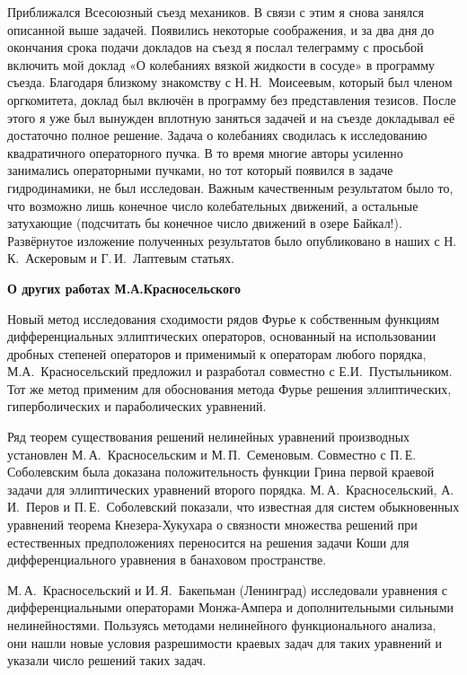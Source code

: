 Приближался Всесоюзный съезд механиков. В связи с этим я снова занялся описанной выше задачей. Появились некоторые соображения, и за два дня до окончания срока подачи докладов на съезд я послал телеграмму с просьбой включить мой доклад «О колебаниях вязкой жидкости в сосуде» в программу съезда. Благодаря близкому знакомству с Н.\,Н.~Моисеевым, который был членом оргкомитета, доклад был включён в программу без представления тезисов. После этого я уже был вынужден вплотную заняться задачей и на съезде докладывал её достаточно полное решение. Задача о колебаниях сводилась к исследованию квадратичного операторного пучка. В то время многие авторы усиленно занимались операторными пучками, но тот который появился в задаче гидродинамики, не был исследован. Важным качественным результатом было то, что возможно лишь конечное число колебательных движений, а остальные затухающие (подсчитать бы конечное число движений в озере Байкал!). Развёрнутое изложение полученных результатов было опубликовано в наших с Н.\,К.~Аскеровым и Г.\,И.~Лаптевым статьях.

{\bf О других работах М.А.Красносельского}

Новый метод исследования сходимости рядов Фурье к собственным фу\-н\-к\-ци\-ям дифференциальных эллиптических операторов,
основанный на  использовании дробных степеней операторов и применимый к операторам любого порядка,
М.А.~Красносельский предложил и разработал совместно с Е.И.~Пустыльником.  Тот же метод применим для обоснования метода Фурье
решения эллиптических, гиперболических и параболических уравнений.

Ряд теорем существования решений нелинейных уравнений производных установлен М.\,А.~Красносельским и
\linebreak
М.\,П.~Семеновым.
Совместно с П.\,Е. Соболевским  была доказана
положительность функции Грина первой краевой задачи для эллиптических уравнений второго порядка.
\linebreak
М.\,А.~Красносельский, А.\,И.~Перов и П.\,Е.~Соболевский показали,
что известная для систем обыкновенных уравнений теорема Кне\-зе\-ра-Ху\-ку\-ха\-ра о связности множества решений при естественных предположениях переносится на решения задачи Коши для дифференциального уравнения в банаховом пространстве.

М.\,А.~Красносельский и И.\,Я.~Бакепьман (Ленинград) исследовали уравнения с дифференциальными операторами Монжа-Ампера и дополнительными сильными нелинейностями. Пользуясь методами нелинейного функционального анализа, они нашли новые условия разрешимости краевых задач для таких уравнений и указали число решений таких задач.

